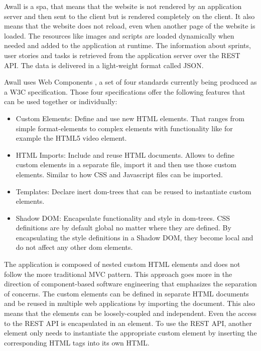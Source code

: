 \documentclass{sigchi}
\begin{document}
Awall is a \gls{spa}, that means that the website is not rendered by an application server and then sent to the client but is rendered completely on the client.
It also means that the website does not reload, even when another page of the website is loaded. 
The resources like images and scripts are loaded dynamically when needed and added to the application at runtime.
The information about sprints, user stories and tasks is retrieved from the application server over the REST API.
The data is delivered in a light-weight format called JSON. 

Awall uses Web Components \cite{webcomponents.org}, a set of four standards currently being produced as a W3C specification.
Those four specifications offer the following features that can be used together or individually:
\begin{itemize}
	\item Custom Elements: Define and use new HTML elements. 
	That ranges from simple format-elements to complex elements with functionality like for example the HTML5 video element.
	\item HTML Imports: Include and reuse HTML documents.
	Allows to define custom elements in a separate file,  import it and then use those custom elements. 
	Similar to how CSS and Javascript files can be imported.
	\item Templates: Declare inert \gls{dom}-trees that can be reused to instantiate custom elements.
	\item Shadow DOM: Encapsulate functionality and style in \gls{dom}-trees.
	CSS definitions are by default global no matter where they are defined.
	By encapsulating the style definitions in a Shadow DOM, they become local and do not affect any other \gls{dom} elements.
\end{itemize}

The application is composed of nested custom HTML elements and does not follow the more traditional MVC pattern. 
This approach goes more in the direction of component-based software engineering that emphasizes the separation of concerns.
The custom elements can be defined in separate HTML documents and be reused in multiple web applications by importing the document.
This also means that the elements can be loosely-coupled and independent.
Even the access to the REST API is encapsulated in an element. 
To use the REST API, another element only needs to instantiate the appropriate custom element by inserting the corresponding HTML tags into its own HTML.
\end{document}
